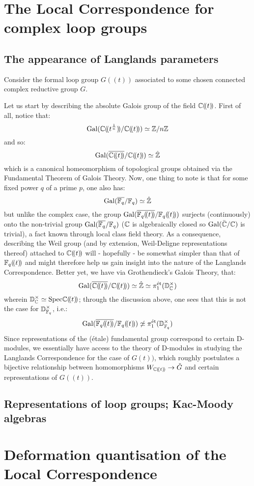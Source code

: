     \section{The Local Correspondence for complex loop groups}
        \subsection{The appearance of Langlands parameters}
            Consider the formal loop group $G(\!(t)\!)$ associated to some chosen connected complex reductive group $G$. 
            
            Let us start by describing the absolute Galois group of the field $\mathbb{C}(\!(t)\!)$. First of all, notice that:
                $$\mathrm{Gal}(\mathbb{C}(\!(t^{\frac1n})\!)/\mathbb{C}(\!(t)\!)) \simeq \mathbb{Z}/n\mathbb{Z}$$
            and so:
                $$\mathrm{Gal}(\overline{\mathbb{C}(\!(t)\!)}/\mathbb{C}(\!(t)\!)) \simeq \hat{\mathbb{Z}}$$
            which is a canonical homeomorphism of topological groups obtained via the Fundamental Theorem of Galois Theory. Now, one thing to note is that for some fixed power $q$ of a prime $p$, one also has:
                $$\mathrm{Gal}(\overline{\mathbb{F}_q}/\mathbb{F}_q) \simeq \hat{\mathbb{Z}}$$
            but unlike the complex case, the group $\mathrm{Gal}(\overline{\mathbb{F}_q(\!(t)\!)}/\mathbb{F}_q(\!(t)\!))$ surjects (continuously) onto the non-trivial group $\mathrm{Gal}(\overline{\mathbb{F}_q}/\mathbb{F}_q)$ ($\mathbb{C}$ is algebraically closed so $\mathrm{Gal}(\bar{\mathbb{C}}/\mathbb{C})$ is trivial), a fact known through local class field theory. As a consequence, describing the Weil group (and by extension, Weil-Deligne representations thereof) attached to $\mathbb{C}(\!(t)\!)$ will - hopefully - be somewhat simpler than that of $\mathbb{F}_q(\!(t)\!)$ and might therefore help us gain insight into the nature of the Langlands Correspondence. Better yet, we have via Grothendieck's Galois Theory, that:
                $$\Gal(\overline{\bbC(\!(t)\!)}/\bbC(\!(t)\!)) \cong \hat{\Z} \cong \pi_1^{\et}(\bbD^{\x}_{\bbC})$$
            wherein $\bbD^{\x}_{\bbC} \cong \Spec \bbC(\!(t)\!)$; through the discussion above, one sees that this is not the case for $\bbD^{\x}_{\F_q}$, i.e.:
                $$\Gal(\overline{\F_q(\!(t)\!)}/\F_q(\!(t)\!)) \not \cong \pi_1^{\et}(\bbD^{\x}_{\F_q})$$
            Since representations of the (\'etale) fundamental group correspond to certain D-modules, we essentially have access to the theory of D-modules in studying the Langlands Correspondence for the case of $G\!(t)\!)$, which roughly postulates a bijective relationship between homomorphisms $W_{\mathbb{C}(\!(t)\!)} \to \check{G}$ and certain representations of $G(\!(t)\!)$.
        
        \subsection{Representations of loop groups; Kac-Moody algebras}
    
    \section{Deformation quantisation of the Local Correspondence}